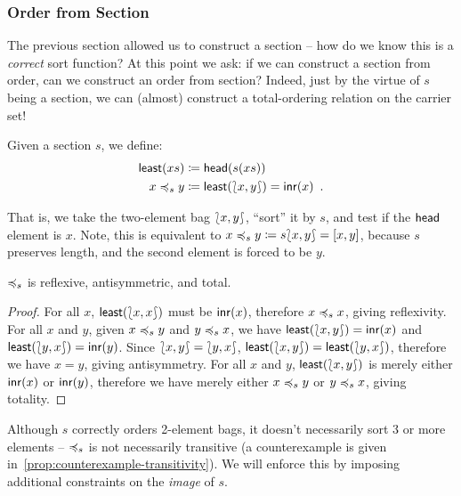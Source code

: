 \subsubsection{Order from Section}

The previous section allowed us to construct a section -- how do we know this is a \emph{correct} sort function?
%
At this point we ask: if we can construct a section from order, can we construct an order from section?
%
Indeed, just by the virtue of $s$ being a section,
we can (almost) construct a total-ordering relation on the carrier set!

\begin{definition}
    \label{def:least}
    Given a section $s$, we define:
    \[
        \begin{aligned}
            \operatorname{\mathsf{least}}(xs) & \mathrel{\coloneq} \operatorname{\mathsf{head}}(s(xs))                           \\
            x \preccurlyeq_{s} y        & \mathrel{\coloneq} \operatorname{\mathsf{least}}({\lbag}{x, y}{\rbag}) = \operatorname{\mathsf{inr}}(x) \enspace.
        \end{aligned}
    \]
\end{definition}
%
That is, we take the two-element bag ${\lbag}{x, y}{\rbag}$,
``sort'' it by $s$, and test if the $\operatorname{\mathsf{head}}$ element is $x$.
%
Note, this is equivalent to $x \preccurlyeq_{s} y \mathrel{\coloneq} s{\lbag}{x, y}{\rbag} = [x,y]$,
because $s$ preserves length, and the second element is forced to be $y$.
%

\begin{proposition}
    \label{sort:almost-total}
    $\preccurlyeq_{s}$ is reflexive, antisymmetric, and total.
\end{proposition}
\begin{proof}
    For all $x$, $\operatorname{\mathsf{least}}({\lbag}{x, x}{\rbag})$ must be $\operatorname{\mathsf{inr}}(x)$, therefore $x \preccurlyeq_{s} x$, giving reflexivity.
    For all $x$ and $y$, given $x \preccurlyeq_{s} y$ and $y \preccurlyeq_{s} x$,
    we have $\operatorname{\mathsf{least}}({\lbag}{x, y}{\rbag}) = \operatorname{\mathsf{inr}}(x)$ and $\operatorname{\mathsf{least}}({\lbag}{y, x}{\rbag}) = \operatorname{\mathsf{inr}}(y)$.
    Since ${\lbag}{x, y}{\rbag} = {\lbag}{y, x}{\rbag}$, $\operatorname{\mathsf{least}}({\lbag}{x, y}{\rbag}) = \operatorname{\mathsf{least}}({\lbag}{y, x}{\rbag})$,
    therefore we have $x = y$, giving antisymmetry.
    For all $x$ and $y$, $\operatorname{\mathsf{least}}({\lbag}{x, y}{\rbag})$ is merely either $\operatorname{\mathsf{inr}}(x)$ or $\operatorname{\mathsf{inr}}(y)$,
    therefore we have merely either $x \preccurlyeq_{s} y$ or $y \preccurlyeq_{s} x$, giving totality.
\end{proof}

Although $s$ correctly orders 2-element bags, it doesn't necessarily sort 3 or more elements --
$\preccurlyeq_{s}$ is not necessarily transitive (a counterexample is given in~\cref{prop:counterexample-transitivity}).
%
We will enforce this by imposing additional constraints on the \emph{image} of $s$.

